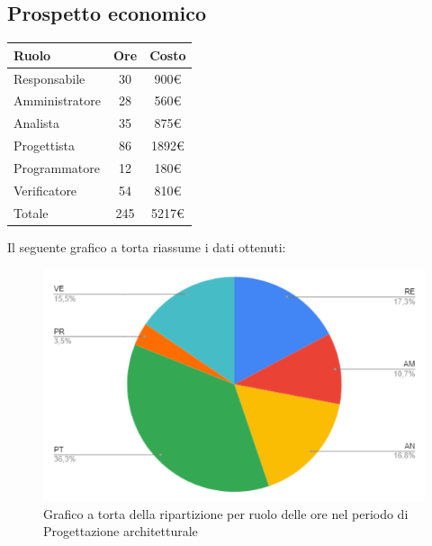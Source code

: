 {{{{{\subsection{Prospetto economico}\label{PreventivoFaseDiProgettazioneArchitetturaleProspettoEconomico}
\quad
\def\tabularxcolumn#1{m{#1}}
{
	\begin{center}
		\renewcommand{\arraystretch}{1.4}
		\begin{tabularx}{7cm}{|X|c|c|}
			\hline
			\rowcolor{airforceblue}
			\textbf{Ruolo} & \textbf{Ore} & \textbf{Costo}\\
			\hline
			Responsabile & 30 & 900\euro\\
			\hline
			Amministratore & 28 & 560\euro\\
			\hline
			Analista & 35 & 875\euro\\
			\hline
			Progettista & 86 & 1892\euro\\
			\hline
			Programmatore & 12 & 180\euro\\
			\hline
			Verificatore & 54 & 810\euro\\
			\hline
			Totale & 245 & 5217\euro\\
			\hline
		\end{tabularx}
	\end{center}

Il seguente grafico a torta riassume i dati ottenuti:
\begin{figure}[!ht]
	\begin{center}
		\includegraphics[width=0.8\linewidth]{../immagini/pdp/torta_progettazione_architetturale.png}
		\caption{Grafico a torta della ripartizione per ruolo delle ore nel periodo di Progettazione architetturale}
	\end{center}
\end{figure}

}}}}}}

